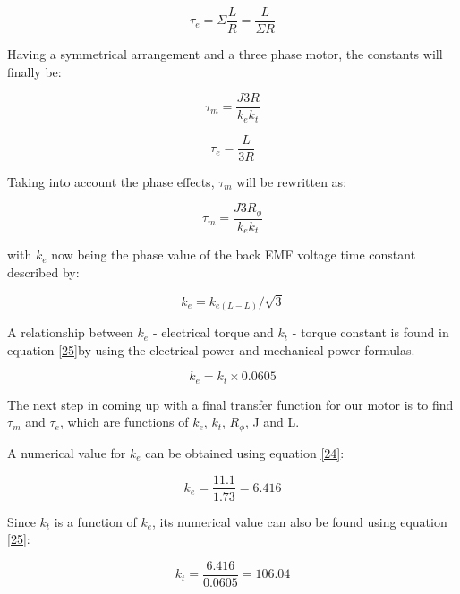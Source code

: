 \begin{equation}
\label{20}
	\tau_{e}=\Sigma{\frac{L}{R}}=\frac{L}{\Sigma{R}}
\end{equation}

Having a symmetrical arrangement and a three phase motor, the constants will finally be:

\begin{equation}
\label{21}
	\tau_{m}=\frac{J3R}{k_{e}k_{t}}
\end{equation}

\begin{equation}
\label{22}
	\tau_{e}=\frac{L}{3R}
\end{equation}

Taking into account the phase effects, $\tau_{m}$ will be rewritten as:

\begin{equation}
\label{23}
	\tau_{m}=\frac{J3R_{\phi}}{k_{e}k_{t}}
\end{equation}

with $k_{e}$ now being the phase value of the back EMF voltage time constant described by:

\begin{equation}
\label{24}
	k_{e}=k_{e(L-L)}/\sqrt{3}
\end{equation}

A relationship between $k_{e}$ - electrical torque and $k_{t}$ - torque constant is found in equation \ref{25}by using the electrical power and mechanical power formulas.

\begin{equation}
\label{25}
	k_{e}=k_{t}\times0.0605
\end{equation}

The next step in coming up with a final transfer function for our motor is to find $\tau_{m}$ and $\tau_{e}$, which are functions of $k_{e}$, $k_{t}$, $R_{\phi}$, J and L. 

A numerical value for $k_{e}$ can be obtained using equation \ref{24}:

\begin{equation}
\label{26}
	k_{e}=\frac{11.1}{1.73}=6.416
\end{equation}

Since $k_{t}$ is a function of $k_{e}$, its numerical value can also be found using equation \ref{25}:

\begin{equation}
\label{27}
	k_{t}=\frac{6.416}{0.0605}=106.04
\end{equation}

